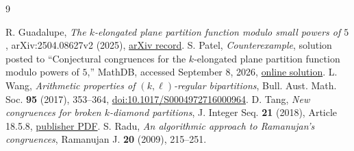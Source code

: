 \documentclass[11pt]{article}
\begin{document}
\begin{thebibliography}{9}
\raggedright
{} R. Guadalupe, \emph{The $k$-elongated plane partition function modulo small powers of $5$}, arXiv:2504.08627v2 (2025), \href{https://arxiv.org/abs/2504.08627}{arXiv record}.
 S. Patel, \emph{Counterexample}, solution posted to ``Conjectural congruences for the $k$-elongated plane partition function modulo powers of $5$,'' MathDB, accessed September 8, 2026, \href{https://mathdb.com/p/382381/conjectural-congruences-for-the-k-elongated-plane-partition}{online solution}.
 L. Wang, \emph{Arithmetic properties of $(k,\ell)$-regular bipartitions}, Bull. Aust. Math. Soc. \textbf{95} (2017), 353--364, \href{https://doi.org/10.1017/S0004972716000964}{doi:10.1017/S0004972716000964}.
 D. Tang, \emph{New congruences for broken $k$-diamond partitions}, J. Integer Seq. \textbf{21} (2018), Article 18.5.8, \href{https://cs.uwaterloo.ca/journals/JIS/VOL21/Tang/tang13.pdf}{publisher PDF}.
 S. Radu, \emph{An algorithmic approach to Ramanujan's congruences}, Ramanujan J. \textbf{20} (2009), 215--251.
\end{thebibliography}
\end{document}

